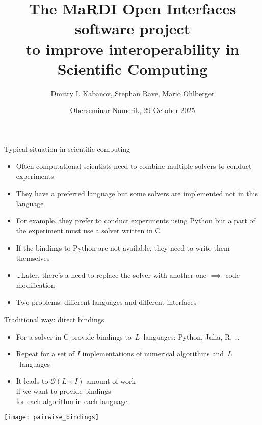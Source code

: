 \documentclass[10pt, aspectratio=169, progressbar=frametitle]{beamer}
\title{%
  The MaRDI Open Interfaces software project\\to improve interoperability in
  Scientific Computing}
\author{Dmitry I. Kabanov, Stephan Rave, Mario Ohlberger}
\institute{Mathematics Münster, University of Münster, Germany}
\date{Oberseminar Numerik, 29 October 2025}
\begin{document}
\maketitle

\begin{frame}{Typical situation in scientific computing}
  \begin{itemize}
    \item Often computational scientists need
          to combine multiple solvers to conduct experiments
    \item They have a preferred language but some solvers are implemented
          not in this language
    \item For example, they prefer to conduct experiments using Python
          but a part of the experiment must use a solver written in C
    \item If the bindings to Python are not available, they need to write
          them themselves
    \item \dots Later, there's a need to replace the solver with
          another one $\implies$ code modification
    \item<2-> \alert{Two problems:} different languages and different interfaces
  \end{itemize}
\end{frame}

\begin{frame}{Traditional way: direct bindings}
  \begin{minipage}{0.45\textwidth}
    \begin{itemize}
      \item For a solver in C provide bindings to~$L$~languages: Python, Julia, R, \dots
      \item Repeat for a set of $I$ implementations of numerical algorithms
            and~$L$~languages
      \item It leads to $\mathcal O(L \times I)$ amount of work\\
      if we want to provide bindings\\
      for each algorithm in each language
    \end{itemize}
  \end{minipage}\hfill
  \begin{minipage}{0.45\textwidth}
    \centering
    \texttt{[image: pairwise\_bindings]}
  \end{minipage}
\end{frame}
\end{document}
